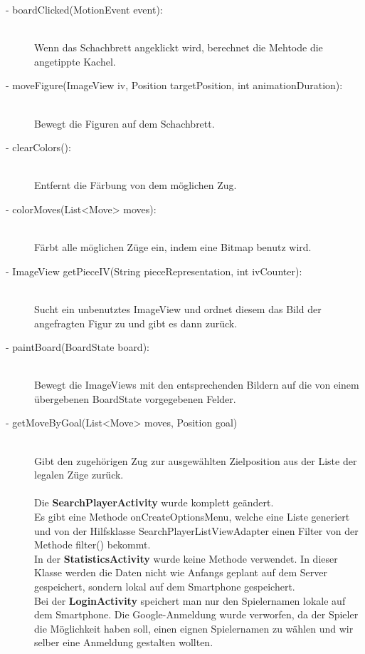 \documentclass[parskip=full]{scrartcl}
\begin{document}
\begin{description}
\item[- boardClicked(MotionEvent event):]\hfill \\ Wenn das Schachbrett angeklickt wird, berechnet die Mehtode die angetippte Kachel.
\item[- moveFigure(ImageView iv, Position targetPosition, int animationDuration):]\hfill \\  Bewegt die Figuren auf dem Schachbrett.\\
\item[- clearColors():]\hfill \\ Entfernt die Färbung von dem möglichen Zug.
\item[- colorMoves(List<Move> moves):]\hfill \\ Färbt alle möglichen Züge ein, indem eine Bitmap benutz wird.
\item[- ImageView getPieceIV(String pieceRepresentation, int ivCounter):]\hfill \\ Sucht ein unbenutztes ImageView und ordnet diesem das Bild der angefragten Figur zu und gibt es dann zurück.
\item[- paintBoard(BoardState board):]\hfill \\ Bewegt die ImageViews mit den entsprechenden Bildern auf die von einem übergebenen BoardState vorgegebenen Felder. \\ 
\item[- getMoveByGoal(List<Move> moves, Position goal)]\hfill \\ Gibt den zugehörigen Zug zur ausgewählten Zielposition aus der Liste der legalen Züge zurück.\\
\\
Die \textbf{SearchPlayerActivity} wurde komplett geändert. \\
Es gibt eine Methode onCreateOptionsMenu, welche eine Liste generiert und von der Hilfsklasse SearchPlayerListViewAdapter einen Filter von der Methode filter() bekommt.\\
In der \textbf{StatisticsActivity} wurde keine Methode verwendet. In dieser Klasse werden die Daten nicht wie Anfangs geplant auf dem Server gespeichert, sondern lokal auf dem Smartphone gespeichert. \\
Bei der \textbf{LoginActivity} speichert man nur den Spielernamen lokale auf dem Smartphone. Die Google-Anmeldung wurde verworfen, da der Spieler die Möglichkeit haben soll, einen eignen Spielernamen zu wählen und wir selber eine Anmeldung gestalten wollten.
\end{description}
\end{document}
